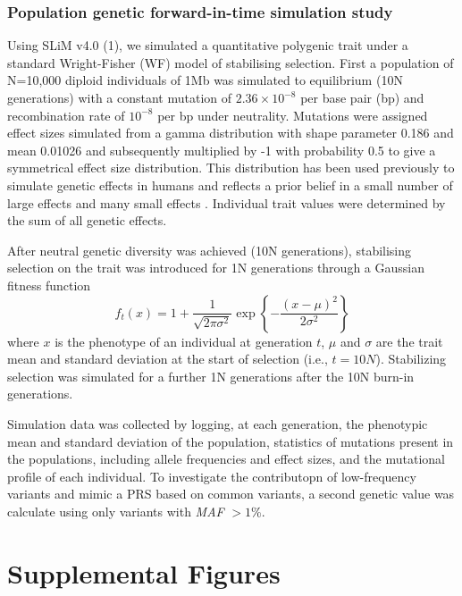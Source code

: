 \documentclass[12pt]{zHenriquesLab-StyleBioRxiv}
\begin{document}
\subsubsection*{Population genetic forward-in-time simulation study} \label{sec:methods:sims} 
Using SLiM v4.0 (1), we simulated a quantitative polygenic trait under
a standard Wright-Fisher (WF) model of stabilising selection. First a
population of N=10,000 diploid individuals of 1Mb was simulated to
equilibrium (10N generations) with a constant mutation of
$2.36\times 10^{-8}$ per base pair (bp) and recombination rate of
$10^{-8}$ per bp under neutrality. Mutations were assigned effect
sizes simulated from a gamma distribution with shape parameter 0.186
and mean 0.01026 and subsequently multiplied by -1 with probability
0.5 to give a symmetrical effect size distribution. This distribution
has been used previously to simulate genetic effects in humans and
reflects a prior belief in a small number of large effects and many
small effects \cite{anil3}. Individual trait values were determined by
the sum of all genetic effects.

After neutral genetic diversity was achieved (10N generations),
stabilising selection on the trait was introduced for 1N
generations through a Gaussian fitness function
\begin{equation} 
  f_t(x) = 1 + \frac{1}{\sqrt{2\pi\sigma^2}} \exp\left\{-\frac{(x-\mu)^2}{2\sigma^2}\right\}
\end{equation}
where $x$ is the phenotype of an individual at generation $t$, $\mu$
and $\sigma$ are the trait mean and standard deviation at the start of
selection (i.e., $t=10N$). Stabilizing selection was simulated for a
further 1N generations after the 10N burn-in generations.

Simulation data was collected by logging, at each generation, the
phenotypic mean and standard deviation of the population, statistics
of mutations present in the populations, including allele frequencies
and effect sizes, and the mutational profile of each individual. To
investigate the contributopn of low-frequency variants and mimic a PRS
based on common variants, a second genetic value was calculate using
only variants with \emph{MAF} $> 1\%$.


\clearpage \newpage

\clearpage \newpage


\section*{Supplemental Figures} \label{sec:supplement}
\end{document}
